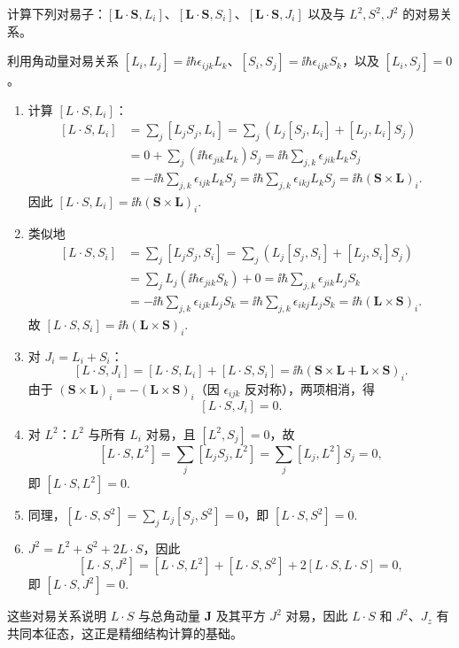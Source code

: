 \begin{question}
计算下列对易子：$[\mathbf L\cdot\mathbf S,L_i]$、$[\mathbf L\cdot\mathbf S,S_i]$、$[\mathbf L\cdot\mathbf S,J_i]$ 以及与 $L^2,S^2,J^2$ 的对易关系。
\end{question}
\begin{solution}
利用角动量对易关系 $[L_i,L_j]=\ii\hbar\epsilon_{ijk}L_k$、$[S_i,S_j]=\ii\hbar\epsilon_{ijk}S_k$，以及 $[L_i,S_j]=0$。

\begin{enumerate}
\item 计算 $[L\cdot S,L_i]$：
\[
\begin{aligned}
[L\cdot S,L_i]&=\sum_j[L_jS_j,L_i]
=\sum_j\left(L_j[S_j,L_i]+[L_j,L_i]S_j\right) \\
&=0+\sum_j(\ii\hbar\epsilon_{jik}L_k)S_j
=\ii\hbar\sum_{j,k}\epsilon_{jik}L_kS_j \\
&=-\ii\hbar\sum_{j,k}\epsilon_{ijk}L_kS_j
=\ii\hbar\sum_{j,k}\epsilon_{ikj}L_kS_j
=\ii\hbar(\mathbf S\times\mathbf L)_i.
\end{aligned}
\]
因此 $\boxed{[L\cdot S,L_i]=\ii\hbar(\mathbf S\times\mathbf L)_i.}$

\item 类似地
\[
\begin{aligned}
[L\cdot S,S_i]&=\sum_j[L_jS_j,S_i]
=\sum_j\left(L_j[S_j,S_i]+[L_j,S_i]S_j\right)\\
&=\sum_j L_j(\ii\hbar\epsilon_{jik}S_k)+0
=\ii\hbar\sum_{j,k}\epsilon_{jik}L_jS_k\\
&=-\ii\hbar\sum_{j,k}\epsilon_{ijk}L_jS_k
=\ii\hbar\sum_{j,k}\epsilon_{ikj}L_jS_k
=\ii\hbar(\mathbf L\times\mathbf S)_i.
\end{aligned}
\]
故 $\boxed{[L\cdot S,S_i]=\ii\hbar(\mathbf L\times\mathbf S)_i.}$

\item 对 $J_i=L_i+S_i$：
\[
[L\cdot S,J_i]=[L\cdot S,L_i]+[L\cdot S,S_i]
=\ii\hbar(\mathbf S\times\mathbf L+\mathbf L\times\mathbf S)_i.
\]
由于 $(\mathbf S\times\mathbf L)_i=-(\mathbf L\times\mathbf S)_i$（因 $\epsilon_{ijk}$ 反对称），两项相消，得
\[
\boxed{[L\cdot S,J_i]=0.}
\]

\item 对 $L^2$：$L^2$ 与所有 $L_i$ 对易，且 $[L^2,S_j]=0$，故
\[
[L\cdot S,L^2]=\sum_j[L_jS_j,L^2]=\sum_j[L_j,L^2]S_j=0,
\]
即 $\boxed{[L\cdot S,L^2]=0.}$

\item 同理，$[L\cdot S,S^2]=\sum_j L_j[S_j,S^2]=0$，即 $\boxed{[L\cdot S,S^2]=0.}$

\item $J^2=L^2+S^2+2L\cdot S$，因此
\[
[L\cdot S,J^2]=[L\cdot S,L^2]+[L\cdot S,S^2]+2[L\cdot S,L\cdot S]=0,
\]
即 $\boxed{[L\cdot S,J^2]=0.}$
\end{enumerate}

这些对易关系说明 $L\cdot S$ 与总角动量 $\mathbf J$ 及其平方 $J^2$ 对易，因此 $L\cdot S$ 和 $J^2$、$J_z$ 有共同本征态，这正是精细结构计算的基础。
\end{solution}

